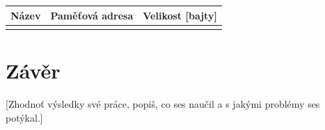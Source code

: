 \documentclass[10pt, a4paper]{article}
\begin{document}
\begin{center}
    \begin{tabularx}{0.8\textwidth}{
        | >{\raggedright\arraybackslash}X
        | >{\raggedright\arraybackslash}X
        | >{\raggedright\arraybackslash}X | }
         \hline
         Název & Paměťová adresa & Velikost [bajty] \\
         \hline
         [doplň údaje] &  &  \\
         \hline
    \end{tabularx}
\end{center}

\section{Závěr}
[Zhodnoť výsledky své práce, popiš, co ses naučil a s jakými problémy ses potýkal.]

\newpage


\end{document}
